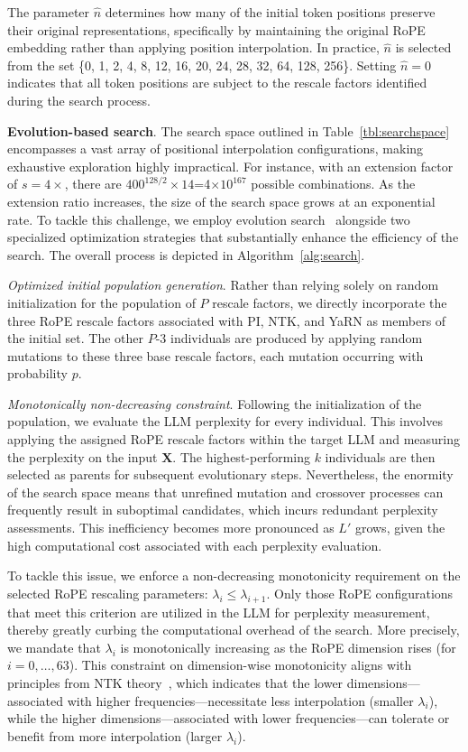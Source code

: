 The parameter $\hat{n}$ determines how many of the initial token positions preserve their original representations, specifically by maintaining the original RoPE embedding rather than applying position interpolation. In practice, $\hat{n}$ is selected from the set \{0, 1, 2, 4, 8, 12, 16, 20, 24, 28, 32, 64, 128, 256\}. Setting $\hat{n}=0$ indicates that all token positions are subject to the rescale factors identified during the search process.

\textbf{Evolution-based search}. The search space outlined in Table~\ref{tbl:searchspace} encompasses a vast array of positional interpolation configurations, making exhaustive exploration highly impractical. For instance, with an extension factor of $s=4\times$, there are $400^{128/2}\times14$=4$\times10^{167}$ possible combinations. As the extension ratio increases, the size of the search space grows at an exponential rate. To tackle this challenge, we employ evolution search~\cite{guo2020single} alongside two specialized optimization strategies that substantially enhance the efficiency of the search. The overall process is depicted in Algorithm~\ref{alg:search}.

\textit{Optimized initial population generation}. Rather than relying solely on random initialization for the population of $P$ rescale factors, we directly incorporate the three RoPE rescale factors associated with PI, NTK, and YaRN as members of the initial set. The other $P$-3 individuals are produced by applying random mutations to these three base rescale factors, each mutation occurring with probability $p$.

\textit{Monotonically non-decreasing constraint}. Following the initialization of the population, we evaluate the LLM perplexity for every individual. This involves applying the assigned RoPE rescale factors within the target LLM and measuring the perplexity on the input $\mathbf{X}$. The highest-performing $k$ individuals are then selected as parents for subsequent evolutionary steps. Nevertheless, the enormity of the search space means that unrefined mutation and crossover processes can frequently result in suboptimal candidates, which incurs redundant perplexity assessments. This inefficiency becomes more pronounced as $L'$ grows, given the high computational cost associated with each perplexity evaluation.

To tackle this issue, we enforce a non-decreasing monotonicity requirement on the selected RoPE rescaling parameters: $\lambda_i \leq \lambda_{i+1}$. Only those RoPE configurations that meet this criterion are utilized in the LLM for perplexity measurement, thereby greatly curbing the computational overhead of the search. More precisely, we mandate that $\lambda_i$ is monotonically increasing as the RoPE dimension rises (for $i = 0, \ldots, 63$). This constraint on dimension-wise monotonicity aligns with principles from NTK theory~\cite{jacot2018neural,tancik2020fourier,ntk}, which indicates that the lower dimensions—associated with higher frequencies—necessitate less interpolation (smaller $\lambda_i$), while the higher dimensions—associated with lower frequencies—can tolerate or benefit from more interpolation (larger $\lambda_i$).

